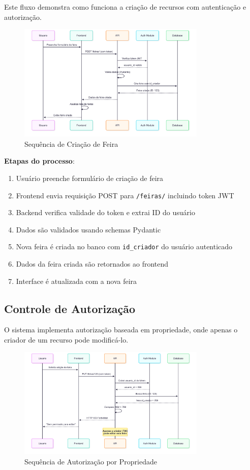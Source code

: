 \documentclass[12pt,a4paper]{article}
\begin{document}
Este fluxo demonstra como funciona a criação de recursos com autenticação e autorização.

\begin{figure}[h]
    \centering
    \includegraphics[width=0.8\textwidth]{diagrams/fluxo_criacao_feira.png}
    \caption{Sequência de Criação de Feira}
    \label{fig:fluxo_criacao_feira}
\end{figure}

\textbf{Etapas do processo}:
\begin{enumerate}
    \item Usuário preenche formulário de criação de feira
    \item Frontend envia requisição POST para \texttt{/feiras/} incluindo token JWT
    \item Backend verifica validade do token e extrai ID do usuário
    \item Dados são validados usando schemas Pydantic
    \item Nova feira é criada no banco com \texttt{id\_criador} do usuário autenticado
    \item Dados da feira criada são retornados ao frontend
    \item Interface é atualizada com a nova feira
\end{enumerate}

\subsection{Controle de Autorização}

O sistema implementa autorização baseada em propriedade, onde apenas o criador de um recurso pode modificá-lo.

\begin{figure}[h]
    \centering
    \includegraphics[width=0.8\textwidth]{diagrams/fluxo_autorizacao.png}
    \caption{Sequência de Autorização por Propriedade}
    \label{fig:fluxo_autorizacao}
\end{figure}
\end{document}

